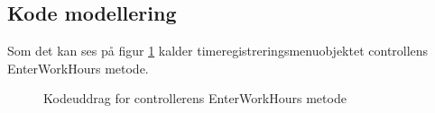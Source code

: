 \subsection{Kode modellering}

Som det kan ses på figur \ref{fig:SDEnterWorkHours} kalder timeregistreringsmenuobjektet controllens EnterWorkHours metode.

\begin{figure}[H]
    \caption{Kodeuddrag for controllerens EnterWorkHours metode}
    \label{fig:SDEnterWorkHours}
\end{figure}


